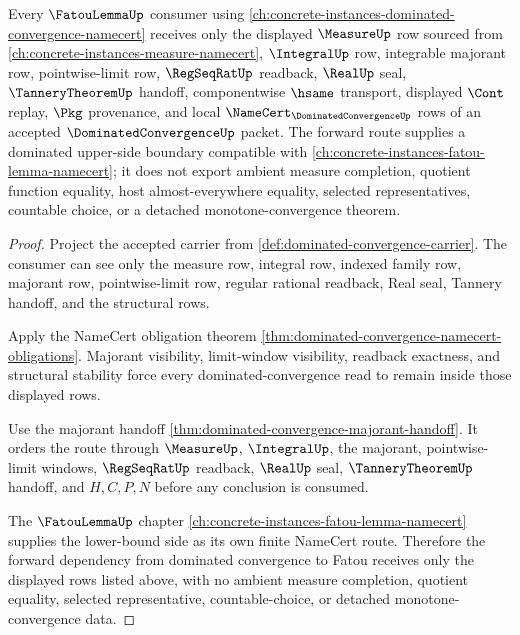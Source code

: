 \begin{theorem}
\label{thm:dominated-convergence-fatou-forward-route}
Every $\FatouLemmaUp$ consumer using \autoref{ch:concrete-instances-dominated-convergence-namecert} receives only the displayed $\MeasureUp$ row sourced from \autoref{ch:concrete-instances-measure-namecert}, $\IntegralUp$ row, integrable majorant row, pointwise-limit row, $\RegSeqRatUp$ readback, $\RealUp$ seal, $\TanneryTheoremUp$ handoff, componentwise $\hsame$ transport, displayed $\Cont$ replay, $\Pkg$ provenance, and local $\NameCert_{\DominatedConvergenceUp}$ rows of an accepted $\DominatedConvergenceUp$ packet. The forward route supplies a dominated upper-side boundary compatible with \autoref{ch:concrete-instances-fatou-lemma-namecert}; it does not export ambient measure completion, quotient function equality, host almost-everywhere equality, selected representatives, countable choice, or a detached monotone-convergence theorem.
\end{theorem}
\begin{proof}
Project the accepted carrier from \autoref{def:dominated-convergence-carrier}. The consumer can see only the measure row, integral row, indexed family row, majorant row, pointwise-limit row, regular rational readback, Real seal, Tannery handoff, and the structural rows.

Apply the NameCert obligation theorem \autoref{thm:dominated-convergence-namecert-obligations}. Majorant visibility, limit-window visibility, readback exactness, and structural stability force every dominated-convergence read to remain inside those displayed rows.

Use the majorant handoff \autoref{thm:dominated-convergence-majorant-handoff}. It orders the route through $\MeasureUp$, $\IntegralUp$, the majorant, pointwise-limit windows, $\RegSeqRatUp$ readback, $\RealUp$ seal, $\TanneryTheoremUp$ handoff, and $H,C,P,N$ before any conclusion is consumed.

The $\FatouLemmaUp$ chapter \autoref{ch:concrete-instances-fatou-lemma-namecert} supplies the lower-bound side as its own finite NameCert route. Therefore the forward dependency from dominated convergence to Fatou receives only the displayed rows listed above, with no ambient measure completion, quotient equality, selected representative, countable-choice, or detached monotone-convergence data.
\end{proof}

